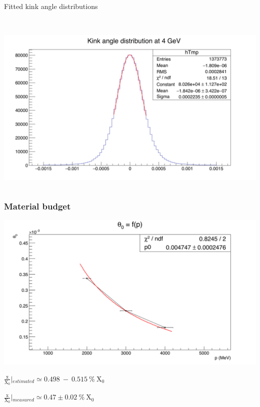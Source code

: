 \documentclass{beamer}
\begin{document}
\begin{frame}
\begin{block}{Fitted kink angle distributions}
\begin{columns}[c]
\begin{column}{5cm}
            \ 
            \includegraphics[width = \textwidth]{Pictures/kinkAngle4GeV.png}
          \end{column} 
        \end{columns}
      \end{block}
    \end{frame}

    \begin{frame}
      \frametitle{Material budget}

      \vspace{-0.2cm}
      \begin{center}
        \includegraphics[width =\textwidth]{Pictures/theta0VsP_2-4GeV.png}

         $\frac{\text{x}}{\text{X}_0}\left|_{estimated} \simeq 0.498~-~0.515~\%~\text{X}_0 \right.$

         $\frac{\text{x}}{\text{X}_0}\left|_{measured} \simeq 0.47 \pm 0.02~\%~\text{X}_0 \right.$
      \end{center}

    \end{frame}
\end{document}
